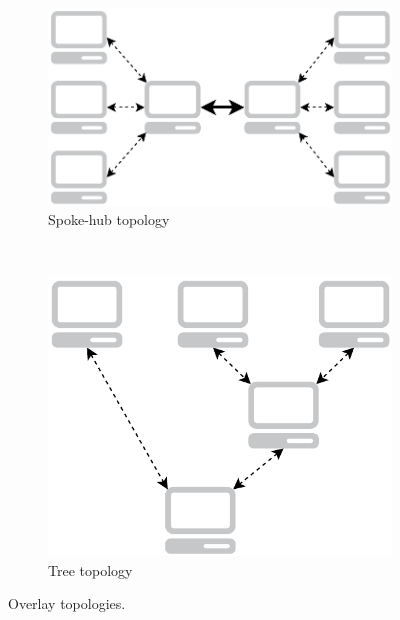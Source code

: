 \begin{figure}[h]
        \centering
        \begin{subfigure}[b]{0.5\textwidth}
                \centering
                \includegraphics[width=\textwidth]{./figures/hubandspoke.pdf}
                \caption{Spoke-hub topology}
                \label{fig:hubandspoke}
        \end{subfigure}%
        ~ %
        \begin{subfigure}[b]{0.5\textwidth}
                \centering
                \includegraphics[width=\textwidth]{./figures/three.pdf}
                \caption{Tree topology}
                \label{fig:three}
        \end{subfigure}
        \caption[Overlay topologies]{Overlay topologies.}
        \label{fig:overlaytopologies}
\end{figure}


